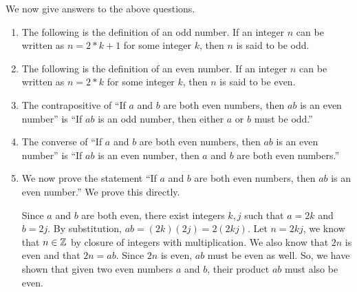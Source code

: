 \documentclass{article}
\begin{document}
We now give answers to the above questions.

\begin{enumerate}
    \item The following is the definition of an odd number.
    If an integer $n$ can be written as $ n = 2*k + 1 $ for some integer $k$, then $n$ is said to be odd.
    \item The following is the definition of an even number.
    If an integer $n$ can be written as $ n = 2*k$ for some integer $k$, then $n$ is said to be even.
    \item The contrapositive of ``If $a$ and $b$ are both even numbers, then $ab$ is an even number'' is ``If $ab$ is an odd number, then either $a$ or $b$ must be odd.''
    \item The converse of ``If $a$ and $b$ are both even numbers, then $ab$ is an even number'' is ``If $ab$ is an even number, then $a$ and $b$ are both even numbers.''
    \item We now prove the statement ``If $a$ and $b$ are both even numbers, then $ab$ is an even number.''
    We prove this directly.

    Since $a$ and $b$ are both even, there exist integers $k,j$ such that $a = 2k$ and $b = 2j$.
    By substitution, $ab = (2k) (2j) = 2(2kj) $.
    Let $n = 2kj$, we know that $n \in {\mathbb Z}$ by closure of integers with multiplication.
    We also know that $2n$ is even and that $2n = ab$.
    Since $2n$ is even, $ab$ must be even as well.
    So, we have shown that given two even numbers $a$ and $b$, their product $ab$ must also be even.
\end{enumerate}


\end{document}
